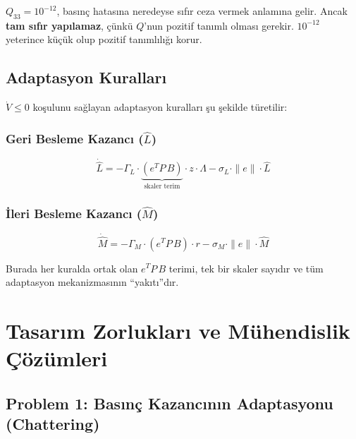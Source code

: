 \documentclass[12pt,a4paper]{article}
\begin{document}
\begin{dikkat}[Neden $10^{-12}$?]
$Q_{33} = 10^{-12}$, basınç hatasına neredeyse sıfır ceza vermek anlamına gelir. Ancak \textbf{tam sıfır yapılamaz}, çünkü $Q$'nun pozitif tanımlı olması gerekir. $10^{-12}$ yeterince küçük olup pozitif tanımlılığı korur.
\end{dikkat}

\subsection{Adaptasyon Kuralları}

$\dot{V} \leq 0$ koşulunu sağlayan adaptasyon kuralları şu şekilde türetilir:

\subsubsection{Geri Besleme Kazancı ($\hat{L}$)}
\begin{equation}
    \boxed{\dot{\hat{L}} = -\Gamma_L \cdot \underbrace{\left(e^T P\,B\right)}_{\text{skaler terim}} \cdot z \cdot \Lambda - \sigma_L \cdot \|e\| \cdot \hat{L}}
    \label{eq:L_update}
\end{equation}

\subsubsection{İleri Besleme Kazancı ($\hat{M}$)}
\begin{equation}
    \boxed{\dot{\hat{M}} = -\Gamma_M \cdot \left(e^T P\,B\right) \cdot r - \sigma_M \cdot \|e\| \cdot \hat{M}}
    \label{eq:M_update}
\end{equation}

Burada her kuralda ortak olan $e^T P\,B$ terimi, tek bir skaler sayıdır ve tüm adaptasyon mekanizmasının ``yakıtı''dır.

\section{Tasarım Zorlukları ve Mühendislik Çözümleri}
\label{sec:challenges}

\subsection{Problem 1: Basınç Kazancının Adaptasyonu (Chattering)}
\label{subsec:partial_adaptation}
\end{document}
